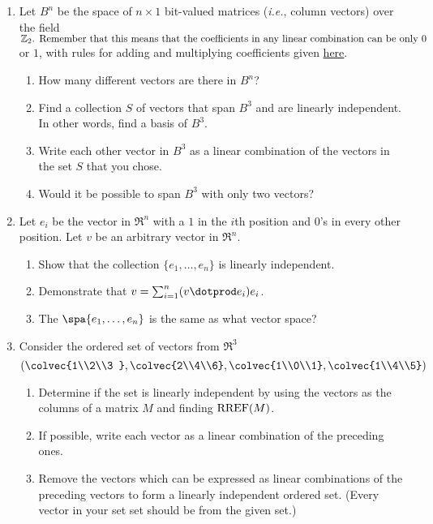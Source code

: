 


\begin{enumerate}
\item \label{bitsprob}Let $B^n$ be the space of $n\times 1$ bit-valued matrices ({\it i.e.}, column vectors) over the field \({\mathbb Z}_2$.
Remember that this means that the coefficients in any linear combination can be only \(0\) or \(1\), with rules for adding and multiplying coefficients given \hyperref[Z2]{here}.  
\begin{enumerate}
\item How many different vectors are there in $B^n$?
\item  Find a collection $S$ of vectors that span $B^3$ and are linearly independent.  In other words, find a basis of $B^3$.
\item Write each other vector in $B^3$ as a linear combination of the vectors in the set $S$ that you chose.
\item Would it be possible to span $B^3$ with only two vectors?
\end{enumerate}



\item \label{stdbasis} Let $e_i$ be the vector in $\Re^n$ with a $1$ in the $i$th position and $0$'s in every other position.  Let $v$ be an arbitrary vector in $\Re^n$.
\begin{enumerate}
\item Show that the collection $\{e_1, \ldots, e_n \}$ is linearly independent.
\item Demonstrate that $v=\sum_{i=1}^n (v\dotprod e_i)e_i$.
\item The $\spa \{e_1, \ldots, e_n \}$ is the same as what vector space?
\end{enumerate}


\item Consider the ordered set of vectors from $\Re^3$
\[
\left( \colvec{1\\2\\3 } , \colvec{2\\4\\6}, \colvec{1\\0\\1} , \colvec{1\\4\\5} \right) 
\]
\begin{enumerate}
\item Determine if the set is linearly independent by using the vectors as the columns of a matrix $M$ and finding ${\rm RREF}(M)$.
\item If possible, write each vector as a linear combination of the preceding ones.
\item Remove the vectors which can be expressed as linear combinations of the preceding vectors to form a linearly independent ordered set. (Every vector in your set set should be from the given set.)
\end{enumerate}


\end{enumerate}
